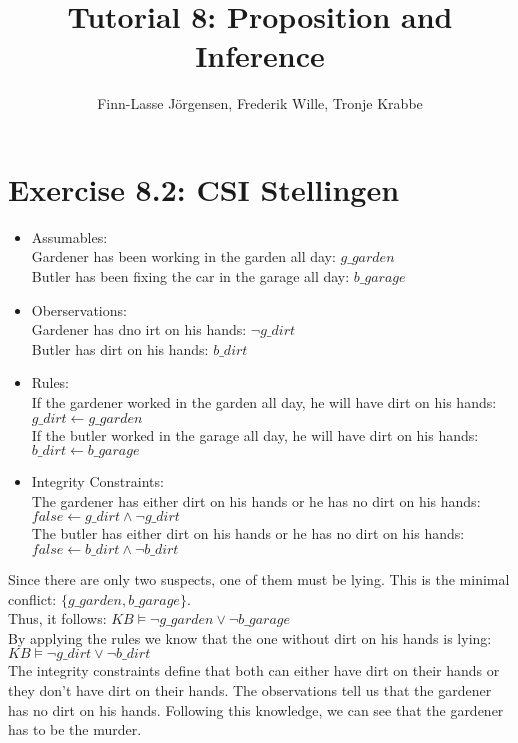 \documentclass[12pt,a4paper]{article}
\author{Finn-Lasse Jörgensen, Frederik Wille, Tronje Krabbe}
\title{Tutorial 8: Proposition and Inference}
\begin{document}
\maketitle

\section*{Exercise 8.2: CSI Stellingen}
\begin{itemize}
\item Assumables:\\
    Gardener has been working in the garden all day: $ g\_garden $\\
    Butler has been fixing the car in the garage all day: $ b\_garage $\\
\item Oberservations:\\
    Gardener has dno irt on his hands: $ \neg g\_dirt $ \\
    Butler has dirt on his hands: $ b\_dirt $ \\
\item Rules:\\
    If the gardener worked in the garden all day, he will have dirt on his hands: $ g\_dirt \leftarrow g\_garden $\\
    If the butler worked in the garage all day, he will have dirt on his hands: $ b\_dirt \leftarrow b\_garage $
\item Integrity Constraints:\\
    The gardener has either dirt on his hands or he has no dirt on his hands: $ false \leftarrow g\_dirt \land \neg g\_dirt $\\
    The butler has either dirt on his hands or he has no dirt on his hands: $ false \leftarrow b\_dirt \land \neg b\_dirt $\\
\end{itemize}
Since there are only two suspects, one of them must be lying. This is the minimal conflict:
$ \{ g\_garden, b\_garage \} $.\\
Thus, it follows:
$ KB \models \neg g\_garden \lor \neg b\_garage $\\
By applying the rules we know that the one without dirt on his hands is lying:
$ KB \models \neg g\_dirt \lor \neg b\_dirt $ \\
The integrity constraints define that both can either have dirt on their hands or they don't have dirt on their hands. The observations tell us that the gardener has no dirt on his hands. Following this knowledge, we can see that the gardener has to be the murder.
\end{document}
